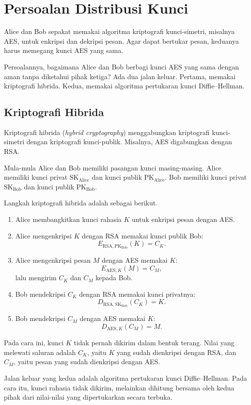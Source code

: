\section{Persoalan Distribusi Kunci}
\label{sec:persoalan-distribusi-kunci}


Alice dan Bob sepakat memakai algoritma kriptografi kunci-simetri, misalnya
AES, untuk enkripsi dan dekripsi pesan. Agar dapat bertukar pesan, keduanya
harus memegang kunci AES yang sama.

Persoalannya, bagaimana Alice dan Bob berbagi kunci AES yang sama dengan aman
tanpa diketahui pihak ketiga? Ada dua jalan keluar. Pertama, memakai
kriptografi hibrida. Kedua, memakai algoritma pertukaran kunci Diffie--Hellman.

\subsection{Kriptografi Hibrida}
\label{subsec:hibrida-eksplisit}

Kriptografi hibrida (\textit{hybrid cryptography}) menggabungkan kriptografi
kunci-simetri dengan kriptografi kunci-publik. Misalnya, AES digabungkan dengan
RSA.

Mula-mula Alice dan Bob memiliki pasangan kunci masing-masing. Alice memiliki
kunci privat $\text{SK}_{\text{Alice}}$ dan kunci publik
$\text{PK}_{\text{Alice}}$. Bob memiliki kunci privat $\text{SK}_{\text{Bob}}$
dan kunci publik $\text{PK}_{\text{Bob}}$.

Langkah kriptografi hibrida adalah sebagai berikut.
\begin{enumerate}
    \item Alice membangkitkan kunci rahasia $K$ untuk enkripsi pesan dengan AES.
    \item Alice mengenkripsi $K$ dengan RSA memakai kunci publik Bob:
          \[ E_{\text{RSA},\text{PK}_{\text{Bob}}}(K) = C_K . \]
    \item Alice mengenkripsi pesan $M$ dengan AES memakai $K$:
          \[ E_{\text{AES},K}(M) = C_M , \]
          lalu mengirim $C_K$ dan $C_M$ kepada Bob.
    \item Bob mendekripsi $C_K$ dengan RSA memakai kunci privatnya:
          \[ D_{\text{RSA},\text{SK}_{\text{Bob}}}(C_K) = K . \]
    \item Bob mendekripsi $C_M$ dengan AES memakai $K$:
          \[ D_{\text{AES},K}(C_M) = M . \]
\end{enumerate}



Pada cara ini, kunci $K$ tidak pernah dikirim dalam bentuk terang. Nilai yang
melewati saluran adalah $C_K$, yaitu $K$ yang sudah dienkripsi dengan RSA, dan
$C_M$, yaitu pesan yang sudah dienkripsi dengan AES.

Jalan keluar yang kedua adalah algoritma pertukaran kunci Diffie--Hellman. Pada
cara itu, kunci rahasia tidak dikirim, melainkan dihitung bersama oleh kedua
pihak dari nilai-nilai yang dipertukarkan secara terbuka.
